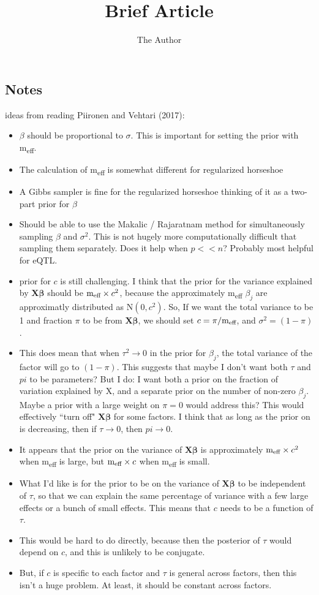 \documentclass[11pt]{amsart}
\title{Brief Article}
\author{The Author}
\begin{document}
\subsection{Notes}
ideas from reading Piironen and Vehtari (2017):
\begin{itemize}
	\item $\beta$ should be proportional to $\sigma$. This is important for setting the prior with m\textsubscript{eff}.
	\item The calculation of  m\textsubscript{eff} is somewhat different for regularized horseshoe
	\item A Gibbs sampler is fine for the regularized horseshoe thinking of it as a two-part prior for $\beta$
	\item Should be able to use the Makalic / Rajaratnam method for simultaneously sampling $\beta$ and $\sigma^2$. This is not hugely more computationally difficult that sampling them separately. Does it help when $p << n$? Probably most helpful for eQTL.
	\item prior for $c$ is still challenging. I think that the prior for the variance explained by $\bm{X}\bm{\beta}$ should be  $\mbox{m\textsubscript{eff}} \times c^2$, because the approximately m\textsubscript{eff} $\beta_j$ are approximatly distributed as $\mbox{N}(0,c^2)$. So, If we want the total variance to be 1 and fraction $\pi$ to be from $\bm{X}\bm{\beta}$, we should set $c = \pi / \mbox{m\textsubscript{eff}}$, and $\sigma^2 = (1-\pi)$.
	\item This does mean that when $\tau^2 \rightarrow 0$ in the prior for $\beta_j$, the total variance of the factor will go to $(1-\pi)$. This suggests that maybe I don't want both $\tau$ and $pi$ to be parameters? But I do: I want both a prior on the fraction of variation explained by X, and a separate prior on the number of non-zero $\beta_j$. Maybe a prior with a large weight on $\pi = 0$ would address this? This would effectively ``turn off" $\bm{X\beta}$ for some factors. I think that as long as the prior on is decreasing, then if $\tau \rightarrow 0$, then $pi \rightarrow 0$.
	\item It appears that the prior on the variance of $\bm{X\beta}$ is approximately $\mbox{m\textsubscript{eff}} \times c^2$ when m\textsubscript{eff} is large, but $\mbox{m\textsubscript{eff}} \times c$ when m\textsubscript{eff} is small.
	\item What I'd like is for the prior to be on the variance of $\bm{X\beta}$ to be independent of $\tau$, so that we can explain the same percentage of variance with a few large effects or a bunch of small effects. This means that $c$ needs to be a function of $\tau$.
	\item This would be hard to do directly, because then the posterior of $\tau$ would depend on $c$, and this is unlikely to be conjugate.
	\item But, if $c$ is specific to each factor and $\tau$ is general across factors, then this isn't a huge problem. At least, it should be constant across factors.
	\
\end{itemize}
\end{document}
